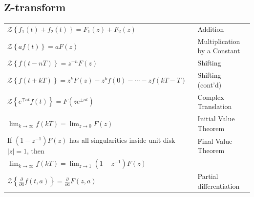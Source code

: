 	\begin{multicols}{2}

\subsection{Z-transform}
\begin{tabular}{p{7.75cm} p{4.75cm}}
$\mathcal{Z} \left\{ f_1(t) \pm f_2(t) \right\}=F_1(z)+F_2(z)$ & Addition\\
$\mathcal{Z} \left\{ af(t) \right\}= aF(z)$ & Multiplication by a Constant \\
$\mathcal{Z} \left\{ f(t-nT) \right\}=z^{-n}F(z)$ & Shifting \\
$\mathcal{Z} \left\{ f(t+kT) \right\}=z^{k}F(z)-z^{k}f(0)- \cdots - z f(kT-T)$ & Shifting (cont'd)\\
$\mathcal{Z} \left\{ e^{\mp at} f(t) \right\}=F(ze^{\pm at})$ & Complex Translation \\
$\lim_{k \rightarrow \infty} f(kT)= \lim_{z \rightarrow 0}F(z)$ & Initial Value Theorem \\ \hline
If $(1-z^{-1})F(z)$ has all singularities inside unit disk $|z|=1$, then & Final Value Theorem \\
$\lim_{k \rightarrow \infty} f(kT) = \lim_{z \rightarrow 1} (1-z^{-1})F(z)$ & \\
$\mathcal{Z} \left\{ \frac{\partial}{\partial a} f(t,a) \right\} = \frac{\partial}{\partial a} F(z,a)$& Partial differentiation
\end{tabular}


\end{multicols}
